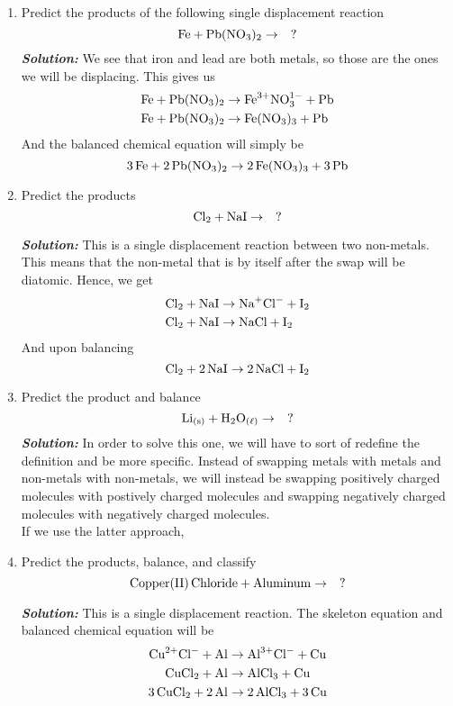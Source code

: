 \documentclass[12pt]{report}
\begin{document}
\begin{enumerate}
    \item{Predict the products of the following single displacement reaction
            \[
                \ce{Fe}+ \ce{Pb(NO3)2}\to\quad ?
            \]
        }
        \textit{\textbf{Solution:}} We see that iron and lead are both metals, so those are the ones we will be displacing. This gives us
        \begin{align*}
            \ce{Fe}+ \ce{Pb(NO3)2}&\to \text{Fe}^{3+} \text{NO}^{1-}_{3}+\ce{Pb}\\ 
            \ce{Fe}+ \ce{Pb(NO3)2}&\to \ce{Fe(NO3)3}+\ce{Pb}
        \end{align*}
        And the balanced chemical equation will simply be 
        \[
           \ce{3Fe}+ \ce{2Pb(NO3)2}\to \ce{2Fe(NO3)3}+ \ce{3Pb} 
        \]

    \item{Predict the products
            \[
                \ce{Cl2}+ \ce{NaI}\to\quad?
            \]
        }

        \textit{\textbf{Solution:}} This is a single displacement reaction between two non-metals. This means that the non-metal that is by itself after the swap will be diatomic. Hence, we get  
        \begin{align*}
            \ce{Cl2}+ \ce{NaI}&\to \text{Na}^{+} \text{Cl}^{-}+ \ce{I2}\\
            \ce{Cl2}+ \ce{NaI}&\to \ce{NaCl}+ \ce{I2}
        \end{align*}
        And upon balancing 
        \[
            \ce{Cl2}+ \ce{2NaI}\to \ce{2NaCl}+ \ce{I2} 
        \]

    \item{Predict the product and balance
            \[
                \ce{Li_{(s)}}+ \ce{H2O_{( \ell )}}\to\quad?
            \]
        }
        \textit{\textbf{Solution:}} In order to solve this one, we will have to sort of redefine the definition and be more specific. Instead of swapping metals with metals and non-metals with non-metals, we will instead be swapping positively charged molecules with postively charged molecules and swapping negatively charged molecules with negatively charged molecules.\\

        If we use the latter approach, 
    
    \item{Predict the products, balance, and classify
        \[
            \ce{Copper(II) Chloride}+ \ce{Aluminum}\to\quad?
        \]}

        \textit{\textbf{Solution:}} This is a single displacement reaction. The skeleton equation and balanced chemical equation will be 
        \begin{align*}
            \text{Cu}^{2+} \text{Cl}^{-}+ \ce{Al}&\to \text{Al}^{3+} \text{Cl}^{-}+ \ce{Cu}\\
            \ce{CuCl2}+ \ce{Al}&\to \ce{AlCl3}+ \ce{Cu}\\
            \ce{3CuCl2}+ \ce{2Al}&\to \ce{2AlCl3}+ \ce{3Cu}
        \end{align*}
\end{enumerate}
\end{document}
